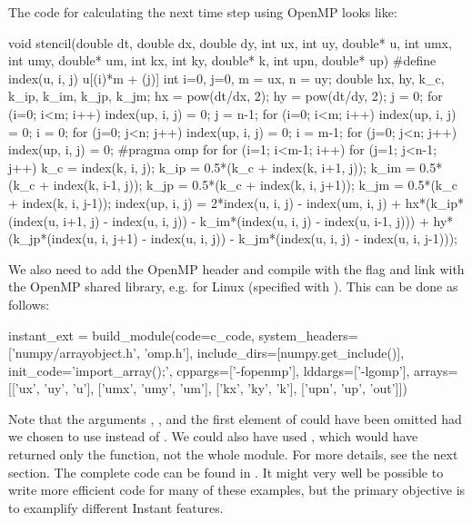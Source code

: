 The code for calculating the next time step using OpenMP looks like:
\begin{code}
void stencil(double dt, double dx, double dy,
             int ux, int uy, double* u,
             int umx, int umy, double* um,
             int kx, int ky, double* k,
             int upn, double* up){
#define index(u, i, j) u[(i)*m + (j)]
  int i=0, j=0, m = ux, n = uy;
  double hx, hy, k_c, k_ip, k_im, k_jp, k_jm;
  hx = pow(dt/dx, 2); 
  hy = pow(dt/dy, 2);
  j = 0;   for (i=0; i<m; i++) index(up, i, j) = 0;
  j = n-1; for (i=0; i<m; i++) index(up, i, j) = 0;
  i = 0;   for (j=0; j<n; j++) index(up, i, j) = 0;
  i = m-1; for (j=0; j<n; j++) index(up, i, j) = 0;
  #pragma omp for
  for (i=1; i<m-1; i++){
    for (j=1; j<n-1; j++){
      k_c = index(k, i, j);
      k_ip = 0.5*(k_c + index(k, i+1, j));
      k_im = 0.5*(k_c + index(k, i-1, j));
      k_jp = 0.5*(k_c + index(k, i, j+1));
      k_jm = 0.5*(k_c + index(k, i, j-1));
      index(up, i, j) = 2*index(u, i, j) - index(um, i, j) + 
        hx*(k_ip*(index(u, i+1, j) - index(u, i, j)) - 
             k_im*(index(u, i, j) - index(u, i-1, j))) + 
        hy*(k_jp*(index(u, i, j+1) - index(u, i, j)) - 
            k_jm*(index(u, i, j) - index(u, i, j-1)));
    }
  }
}
\end{code}
We also need to add the OpenMP header  and compile
with the flag  and link with the OpenMP shared 
library, e.g.  for Linux (specified with ). 
This can be done as follows:
\begin{code}
instant_ext = build_module(code=c_code, 
                           system_headers=['numpy/arrayobject.h', 
                                           'omp.h'],
                           include_dirs=[numpy.get_include()],
                           init_code='import_array();',
                           cppargs=['-fopenmp'], 
                           lddargs=['-lgomp'],
                           arrays=[['ux', 'uy', 'u'], 
                                   ['umx', 'umy', 'um'],
                                   ['kx', 'ky', 'k'],
                                   ['upn', 'up', 'out']])
\end{code}
Note that the arguments , , and the
first element of  could have been omitted had we chosen
to use  instead of . We could also
have used , which would have returned only the
function, not the whole module. For more details, see the next section.
The complete code can be found in . It might very well
be possible to write more efficient code for many of these examples, but the
primary objective is to examplify different Instant features.


